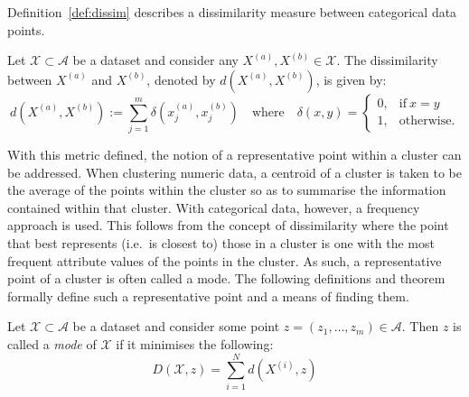 Definition~\ref{def:dissim} describes a dissimilarity measure between
categorical data points.

\begin{definition}\label{def:dissim}
    Let \(\mathcal{X} \subset \mathcal A\) be a dataset and consider any
    \(X^{(a)}, X^{(b)} \in \mathcal{X}\). The dissimilarity between \(X^{(a)}\)
    and \(X^{(b)}\), denoted by \(d\left(X^{(a)}, X^{(b)}\right)\), is given by:
    \begin{equation}\label{eq:dissim}
        d\left(X^{(a)}, X^{(b)}\right) := \sum_{j=1}^{m} \delta\left(x_j^{(a)},
        x_j^{(b)}\right) \quad \text{where} \quad \delta\left(x, y\right) =
        \begin{cases}
            0, & \text{if} \ x = y \\
            1, & \text{otherwise.}
        \end{cases}
    \end{equation}
\end{definition}

%

With this metric defined, the notion of a representative point within a cluster
can be addressed. When clustering numeric data, a centroid of a cluster is taken
to be the average of the points within the cluster so as to summarise the
information contained within that cluster. With categorical data, however, a
frequency approach is used. This follows from the concept of dissimilarity
where the point that best represents (i.e.\ is closest to) those in a cluster
is one with the most frequent attribute values of the points in the cluster. As
such, a representative point of a cluster is often called a mode. The following
definitions and theorem formally define such a representative point and a means
of finding them.

\begin{definition}\label{def:mode}
    Let \(\mathcal{X} \subset \mathcal{A}\) be a dataset and consider some point
    \(z = \left(z_1, \ldots, z_m\right) \in \mathcal{A}\). Then \(z\) is called
    a \emph{mode} of \(\mathcal{X}\) if it minimises the following:
    \begin{equation}\label{eq:summed-dissim}
        D\left(\mathcal{X}, z\right) = \sum_{i=1}^{N} d\left(X^{(i)}, z\right)
    \end{equation}
\end{definition}

